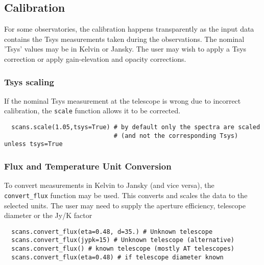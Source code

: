 \subsection{Calibration}
\label{subsection:sd.asap.calib}

For some observatories, the calibration happens transparently as the
input data contains the Tsys measurements taken during the
observations. The nominal 'Tsys' values may be in Kelvin or
Jansky. The user may wish to apply a Tsys correction or apply
gain-elevation and opacity corrections.

\subsubsection{Tsys scaling}
\label{subsubsection:sd.asap.calib.tsys}

If the nominal Tsys measurement at the telescope is wrong due to
incorrect calibration, the {\tt scale} function allows it to be corrected.  

\small
\begin{verbatim}
  scans.scale(1.05,tsys=True) # by default only the spectra are scaled
                              # (and not the corresponding Tsys) unless tsys=True
\end{verbatim}
\normalsize


\subsubsection{Flux and Temperature Unit Conversion}
\label{subsubsection:sd.asap.calib.fluxunit}

To convert measurements in Kelvin to Jansky (and vice versa), the {\tt
convert\_flux} function may be used. This converts and scales the data
to the selected units. The user may need to supply the aperture
efficiency, telescope diameter or the Jy/K factor

\small
\begin{verbatim}
  scans.convert_flux(eta=0.48, d=35.) # Unknown telescope
  scans.convert_flux(jypk=15) # Unknown telescope (alternative)
  scans.convert_flux() # known telescope (mostly AT telescopes)
  scans.convert_flux(eta=0.48) # if telescope diameter known
\end{verbatim}
\normalsize

